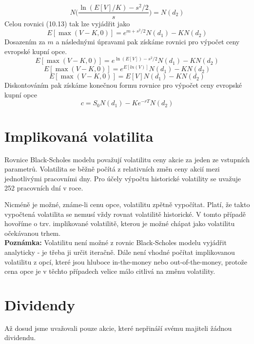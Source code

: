 \documentclass[a4paper]{book}
\begin{document}
\begin{equation*}
N \bigg(\frac{\ln(E[V]/K)-s^2/2}{s}\bigg)=N(d_2)
\end{equation*}
Celou rovnici (10.13) tak lze vyjádřit jako
\begin{equation*}
E[\max(V-K,0)]=e^{m+s^2/2}N(d_1)-KN(d_2)
\end{equation*}
Dosazením za $m$ a následnými úpravami pak získáme rovnici pro výpočet ceny evropské kupní opce.
\begin{equation*}
E[\max(V-K,0)]=e^{\ln(E[V])-s^2/2}N(d_1)-KN(d_2)
\end{equation*}
\begin{equation*}
E[\max(V-K,0)]=e^{E[ln(V)]}N(d_1)-KN(d_2)
\end{equation*}
\begin{equation*}
E[\max(V-K,0)]=E[V]N(d_1)-KN(d_2)
\end{equation*}
Diskontováním pak získáme konečnou formu rovnice pro výpočet ceny evropské kupní opce
\begin{equation*}
c=S_0N(d_1)-Ke^{-rT}N(d_2)
\end{equation*}

\section{Implikovaná volatilita}
Rovnice Black-Scholes modelu považují volatilitu ceny akcie za jeden ze vstupních parametrů. Volatilita se běžně počítá z relativních změn ceny akcií mezi jednotlivými pracovními dny. Pro účely výpočtu historické volatility se uvažuje 252 pracovních dní v roce.

Nicméně je možné, známe-li cenu opce, volatilitu zpětně vypočítat. Platí, že takto vypočtená volatilita se nemusí vždy rovnat volatilitě historické. V tomto případě hovoříme o tzv. implikované volatilitě, kterou je možné chápat jako volatilitu očekávanou trhem.\\

\noindent \textbf{Poznámka:} Volatilitu není možné z rovnic Black-Scholes modelu vyjádřit analyticky - je třeba ji určit iteračně. Dále není vhodné počítat implikovanou volatilitu z opcí, které jsou hluboce in-the-money nebo out-of-the-money, protože cena opce je v těchto případech velice málo citlivá na změnu volatility.

\section{Dividendy}
Až dosud jsme uvažovali pouze akcie, které nepřináší svému majiteli žádnou dividendu.
\end{document}
